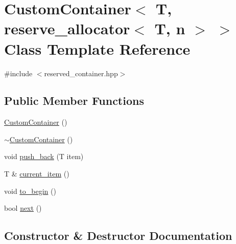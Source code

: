 \hypertarget{classCustomContainer_3_01T_00_01reserve__allocator_3_01T_00_01n_01_4_01_4}{}\section{Custom\+Container$<$ T, reserve\+\_\+allocator$<$ T, n $>$ $>$ Class Template Reference}
\label{classCustomContainer_3_01T_00_01reserve__allocator_3_01T_00_01n_01_4_01_4}


{\ttfamily \#include $<$reserved\+\_\+container.\+hpp$>$}

\subsection*{Public Member Functions}
\begin{DoxyCompactItemize}
\item 
\hyperlink{classCustomContainer_3_01T_00_01reserve__allocator_3_01T_00_01n_01_4_01_4_a330b8e1e23a306434468ad69baeb2ee7}{Custom\+Container} ()
\item 
\hyperlink{classCustomContainer_3_01T_00_01reserve__allocator_3_01T_00_01n_01_4_01_4_a11dae533731736ae4c2309550b793a11}{$\sim$\+Custom\+Container} ()
\item 
void \hyperlink{classCustomContainer_3_01T_00_01reserve__allocator_3_01T_00_01n_01_4_01_4_a7b41f31f5e430ff461b3e906be789058}{push\+\_\+back} (T item)
\item 
T \& \hyperlink{classCustomContainer_3_01T_00_01reserve__allocator_3_01T_00_01n_01_4_01_4_ab6557ab6a4eb23ee58f6aa42e49e87cc}{current\+\_\+item} ()
\item 
void \hyperlink{classCustomContainer_3_01T_00_01reserve__allocator_3_01T_00_01n_01_4_01_4_aa43a96f008af53f254a014629f0627b7}{to\+\_\+begin} ()
\item 
bool \hyperlink{classCustomContainer_3_01T_00_01reserve__allocator_3_01T_00_01n_01_4_01_4_a1714165f87a1ae507e39b97e8a0bda90}{next} ()
\end{DoxyCompactItemize}


\subsection{Constructor \& Destructor Documentation}
